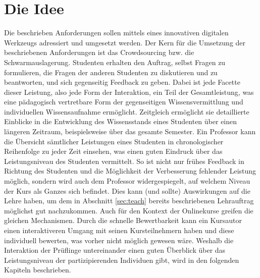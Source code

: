 \section{Die Idee}
\label{sec:idea}
Die beschrieben Anforderungen sollen mittels eines innovativen digitalen Werkzeugs adressiert und umgesetzt werden. Der Kern für die Umsetzung der beschriebenen Anforderungen ist das Crowdsourcing bzw. die Schwarmauslagerung. Studenten erhalten den Auftrag, selbst Fragen zu formulieren, die Fragen der anderen Studenten zu diskutieren und zu beantworten, und sich gegenseitig Feedback zu geben. Dabei ist jede Facette dieser Leistung, also jede Form der Interaktion, ein Teil der Gesamtleistung, was eine pädagogisch vertretbare Form der gegenseitigen Wissensvermittlung und individuellen Wissensaufnahme ermöglicht. Zeitgleich ermöglicht sie detaillierte Einblicke in die Entwicklung des Wissensstands eines Studenten über einen längeren Zeitraum, beispielsweise über das gesamte Semester. Ein Professor kann die Übersicht sämtlicher Leistungen eines Studenten in chronologischer Reihenfolge zu jeder Zeit einsehen, was einen guten Eindruck über das Leistungsniveau des Studenten vermittelt. So ist nicht nur frühes Feedback in Richtung des Studenten und die Möglichkeit der Verbesserung fehlender Leistung möglich, sondern wird auch dem Professor widergespiegelt, auf welchem Niveau der Kurs als Ganzes sich befindet. Dies kann (und sollte) Auswirkungen auf die Lehre haben, um dem in Abschnitt \ref{sec:teach} bereits beschriebenen Lehrauftrag möglichst gut nachzukommen. Auch für den Kontext der Onlinekurse greifen die gleichen Mechanismen. Durch die schnelle Bewertbarkeit kann ein Kursautor einen interaktiveren Umgang mit seinen Kursteilnehmern haben und diese individuell bewerten, was vorher nicht möglich gewesen wäre. Weshalb die Interaktion der Prüflinge untereinander einen guten Überblick über das Leistungsniveau der partizipierenden Individuen gibt, wird in den folgenden Kapiteln beschrieben.

